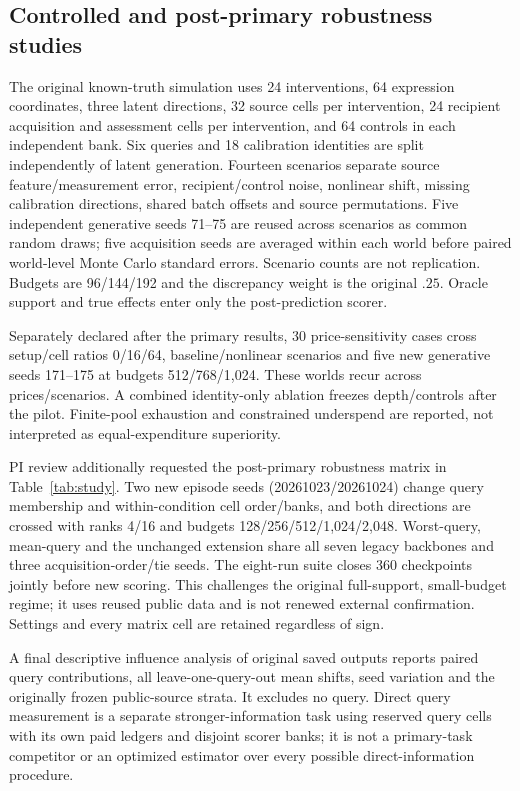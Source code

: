 \subsection{Controlled and post-primary robustness studies}
The original known-truth simulation uses 24 interventions, 64 expression coordinates, three latent directions, 32 source cells per intervention, 24 recipient acquisition and assessment cells per intervention, and 64 controls in each independent bank. Six queries and 18 calibration identities are split independently of latent generation. Fourteen scenarios separate source feature/measurement error, recipient/control noise, nonlinear shift, missing calibration directions, shared batch offsets and source permutations. Five independent generative seeds 71--75 are reused across scenarios as common random draws; five acquisition seeds are averaged within each world before paired world-level Monte Carlo standard errors. Scenario counts are not replication. Budgets are 96/144/192 and the discrepancy weight is the original $.25$. Oracle support and true effects enter only the post-prediction scorer.

Separately declared after the primary results, 30 price-sensitivity cases cross setup/cell ratios 0/16/64, baseline/nonlinear scenarios and five new generative seeds 171--175 at budgets 512/768/1,024. These worlds recur across prices/scenarios. A combined identity-only ablation freezes depth/controls after the pilot. Finite-pool exhaustion and constrained underspend are reported, not interpreted as equal-expenditure superiority.

PI review additionally requested the post-primary robustness matrix in Table~\ref{tab:study}. Two new episode seeds (20261023/20261024) change query membership and within-condition cell order/banks, and both directions are crossed with ranks 4/16 and budgets 128/256/512/1,024/2,048. Worst-query, mean-query and the unchanged extension share all seven legacy backbones and three acquisition-order/tie seeds. The eight-run suite closes 360 checkpoints jointly before new scoring. This challenges the original full-support, small-budget regime; it uses reused public data and is not renewed external confirmation. Settings and every matrix cell are retained regardless of sign.

A final descriptive influence analysis of original saved outputs reports paired query contributions, all leave-one-query-out mean shifts, seed variation and the originally frozen public-source strata. It excludes no query. Direct query measurement is a separate stronger-information task using reserved query cells with its own paid ledgers and disjoint scorer banks; it is not a primary-task competitor or an optimized estimator over every possible direct-information procedure.
